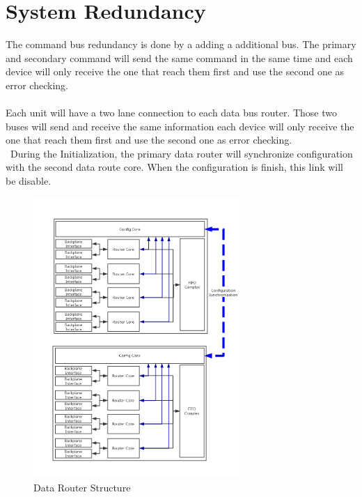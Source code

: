 \documentclass[12pt,article]{memoir}
\begin{document}
\section{System Redundancy}
The command bus redundancy is done by a adding a additional bus. The primary and secondary command will send the same command in the same time and each device will only receive the one that reach them first and use the second one as error checking.\\\\
Each unit will have a two lane connection to each data bus router. Those two buses will send and receive the same information each device will only receive the one that reach them first and use the second one as error checking.\\\
During the Initialization, the primary data router will synchronize configuration with the second data route core. When the configuration is finish, this link will be disable.
\begin{figure}[htp]
\begin{center}
\includegraphics[width=0.7\textwidth]{img/DR00001_SpaceWire_2.png}
 \caption{Data Router Structure}
\end{center}
\end{figure}
\clearpage
\end{document}
